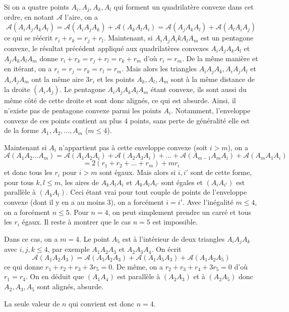\begin{sol}
Si on a quatre points $A_i,A_j,A_k,A_l$ qui forment un quadrilatère convexe dans cet ordre, en notant $\mathcal{A}$ l'aire, on a
$$\mathcal{A}(A_iA_jA_kA_l) = \mathcal{A}(A_iA_jA_k) + \mathcal{A}(A_kA_lA_i) = \mathcal{A}(A_jA_kA_l)+\mathcal{A}(A_lA_iA_j)$$
ce qui se réécrit $r_i+r_k = r_j+r_l$. Maintenant, si $A_iA_jA_ikA_lA_m$ est un pentagone convexe, le résultat précédent appliqué aux quadrilatères convexes $A_iA_jA_kA_l$ et $A_jA_kA_lA_m$ donne $r_i+r_k=r_j+r_l=r_k+r_m$ d'où $r_i=r_m$. De la même manière et en itérant, on a $r_i=r_j=r_k=r_l=r_m$. Mais alors les triangles $A_iA_jA_k,A_iA_jA_l$ et $A_iA_jA_m$ ont la même aire $3r_i$ et les points $A_k,A_l,A_m$ sont à la même distance de la droite $(A_iA_j)$. Le pentagone $A_iA_jA_kA_lA_m$ étant convexe, ils sont aussi du même côté de cette droite et sont donc alignés, ce qui est absurde. Ainsi, il n'existe pas de pentagone convexe parmi les points $A_i$. Notamment, l'enveloppe convexe de ces points contient au plus $4$ points, sans perte de généralité elle est de la forme $A_1,A_2,\ldots,A_m$ ($m\le 4$).

Maintenant si $A_i$ n'appartient pas à cette enveloppe convexe (soit $i>m$), on a
$$\mathcal{A}(A_1A_2\ldots A_m)= \mathcal{A}(A_1A_2A_i)+\mathcal{A}(A_2A_3A_i)+\ldots + \mathcal{A}(A_{m-1}A_mA_i)+\mathcal{A}(A_mA_1A_i)$$
$$=2(r_1+r_2+\ldots+r_m)+mr_i$$
et donc tous les $r_i$ pour $i>m$ sont égaux. Mais alors si $i,i'$ sont de cette forme, pour tous $k,l\le m$, les aires de $A_kA_lA_i$ et $A_kA_lA_{i'}$ sont égales et $(A_iA_{i'})$ est parallèle à $(A_kA_l)$. Ceci étant vrai pour tout couple de points de l'enveloppe convexe (dont il y en a au moins $3$), on a forcément $i=i'$. Avec l'inégalité $m\le 4$, on a forcément $n\le 5$. Pour $n=4$, on peut simplement prendre un carré et tous les $r_i$ égaux. Il reste à montrer que le cas $n=5$ est impossible.

Dans ce cas, on a $m=4$. Le point $A_5$ est à l'intérieur de deux triangles $A_iA_jA_k$ avec $i,j,k\le 4$, par exemple $A_1A_2A_3$ et $A_2A_3A_4$. On écrit
$$\mathcal{A}(A_1A_2A_3) = \mathcal{A}(A_5A_2A_3)+\mathcal{A}(A_1A_5A_3)+\mathcal{A}(A_1A_2A_5)$$
ce qui donne $r_1+r_2+r_3+3r_5=0$. De même, on a $r_2+r_3+r_4+3r_5=0$ d'où $r_1=r_4$. On en déduit que $(A_1A_4)$ est parallèle à $(A_2A_3)$ et à $(A_2A_5)$ donc $A_2,A_3,A_5$ sont alignés, absurde.

La seule valeur de $n$ qui convient est donc $n=4$.
\end{sol}


